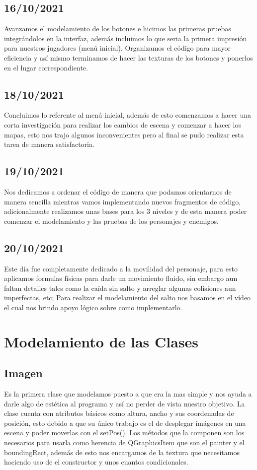 \documentclass{article}
\begin{document}
    \subsection{16/10/2021}
    Avanzamos el modelamiento de los botones e hicimos las primeras pruebas integrándolos en la interfaz, además incluimos lo que seria la primera impresión para nuestros jugadores (menú inicial). Organizamos el código para mayor eficiencia y así mismo terminamos de hacer las texturas de los botones y ponerlos en el lugar correspondiente.
    
    \subsection{18/10/2021}
    Concluimos lo referente al menú inicial, además de esto comenzamos a hacer una corta investigación para realizar los cambios de escena y comenzar a hacer los mapas, esto nos trajo algunos inconvenientes pero al final se pudo realizar esta tarea de manera satisfactoria.
    
    \subsection{19/10/2021}
    Nos dedicamos a ordenar el código de manera que podamos orientarnos de manera sencilla mientras vamos implementando nuevos fragmentos de código, adicionalmente realizamos unas bases para los 3 niveles y de esta manera poder comenzar el modelamiento y las pruebas de los personajes y enemigos.
    
    \subsection{20/10/2021}
    Este día fue completamente dedicado a la movilidad del personaje, para esto aplicamos formulas físicas para darle un movimiento fluido, sin embargo aun faltan detalles tales como la caída sin salto y arreglar algunas colisiones aun imperfectas, etc; Para realizar el modelamiento del salto nos basamos en el vídeo \cite{video_jump} el cual nos brindo apoyo lógico sobre como implementarlo.
    
\section{Modelamiento de las Clases}
    \subsection{Imagen}
    Es la primera clase que modelamos puesto a que era la mas simple y nos ayuda a darle algo de estética al programa y así no perder de vista nuestro objetivo. La clase cuenta con atributos básicos como altura, ancho y sus coordenadas de posición, esto debido a que su único trabajo es el de desplegar imágenes en una escena y poder moverlas con el setPos(). Los métodos que la componen son los necesarios para usarla como herencia de QGraphicsItem que son el painter y el boundingRect, además de esto nos encargamos de la textura que necesitamos haciendo uso de el constructor y unos cuantos condicionales.
    
\end{document}
